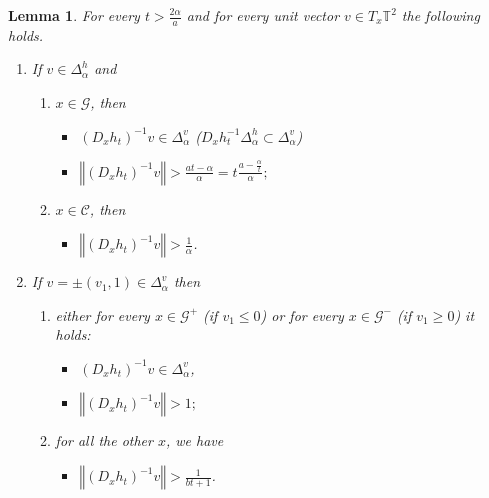 \documentclass[11pt,letterpaper,reqno]{article}
\newtheorem{lemma}{Lemma}[section]
\newcommand{\norm}[1]{\left\Vert#1\right\Vert}
\newcommand{\Tor}{\mathbb{T}^2}
\newcommand{\Deh}{\Delta_{\alpha}^h}
\newcommand{\Dev}{\Delta_{\alpha}^v}
\begin{document}
\begin{lemma}\label{lem:estimativasht}
For every $t>\frac{2\alpha}a$ and for every unit vector $v\in T_x\Tor$ the following holds.
\begin{enumerate}
		\item If $v\in \Deh$ and
		\begin{enumerate}
			\item $x\in\mathcal G$, then
			\begin{itemize}
				\item \((D_xh_t)^{-1}v\in\Dev\) ($D_xh_t^{-1}\Deh\subset\Dev$)
				\item \(\norm{(D_xh_t)^{-1}v}> \frac{at-\alpha}{\alpha}=t\frac{a-\frac{\alpha}t}{\alpha};\)
			\end{itemize}
			\item $x\in\mathcal C$, then
			\begin{itemize}
				\item \(\norm{(D_xh_t)^{-1}v}> \frac{1}{\alpha}\).	
			\end{itemize}
		\end{enumerate}
		\item If $v=\pm(v_1,1)\in \Dev$ then 
		\begin{enumerate}
			\item either for every $x\in \mathcal G^+$ (if $v_1\leq 0$) or for every $x\in \mathcal G^-$ (if $v_1\geq 0$) it holds:
			\begin{itemize}
				\item \((D_xh_t)^{-1}v\in\Delta_{\alpha}^v\),
				\item \(\norm{(D_xh_t)^{-1}v}> 1;\)
			\end{itemize}
			\item for all the other $x$, we have 
			\begin{itemize}
				\item \(\norm{(D_xh_t)^{-1}v}> \frac{1}{bt+1}\).	
			\end{itemize}
		\end{enumerate}			
\end{enumerate}
\end{lemma}
\end{document}

